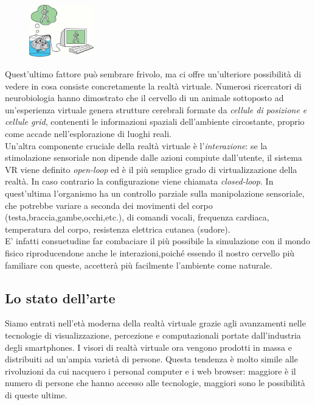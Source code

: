 \begin{figure} %
	\centering
	\includegraphics[width=0.25\textwidth]{figure/VRfool}
\end{figure}
Quest'ultimo fattore può sembrare frivolo, ma ci offre un'ulteriore possibilità di vedere in cosa consiste concretamente la realtà virtuale. Numerosi ricercatori di neurobiologia hanno dimostrato che il cervello di un animale sottoposto ad un'esperienza virtuale genera strutture cerebrali formate da \textit{cellule di posizione e cellule grid}, contenenti le informazioni spaziali dell'ambiente circostante, proprio come accade nell'esplorazione di luoghi reali.\\
Un'altra componente cruciale della realtà virtuale è l'\textit{interazione}: se la stimolazione sensoriale non dipende dalle azioni compiute dall'utente, il sistema VR viene definito \textit{open-loop} ed è il più semplice grado di virtualizzazione della realtà. In caso contrario la configurazione viene chiamata \textit{closed-loop}. In quest'ultima l'organismo ha un controllo parziale sulla manipolazione sensoriale, che potrebbe variare a seconda dei movimenti del corpo (testa,braccia,gambe,occhi,etc.), di comandi vocali, frequenza cardiaca, temperatura del corpo, resistenza elettrica cutanea (sudore).\\ E' infatti consuetudine far combaciare il più possibile la simulazione con il mondo fisico riproducendone anche le interazioni,poiché essendo il nostro cervello più familiare con queste, accetterà più facilmente l'ambiente come naturale.
\newpage

\subsection{Lo stato dell'arte}

Siamo entrati nell'età moderna della realtà virtuale grazie agli avanzamenti nelle tecnologie di visualizzazione, percezione e computazionali portate dall'industria degli smartphones. I visori di realtà virtuale ora vengono prodotti in massa e distribuiti ad un'ampia varietà di persone. Questa tendenza è molto simile alle rivoluzioni da cui nacquero i personal computer e i web browser: maggiore è il numero di persone che hanno accesso alle tecnologie, maggiori sono le possibilità di queste ultime.
